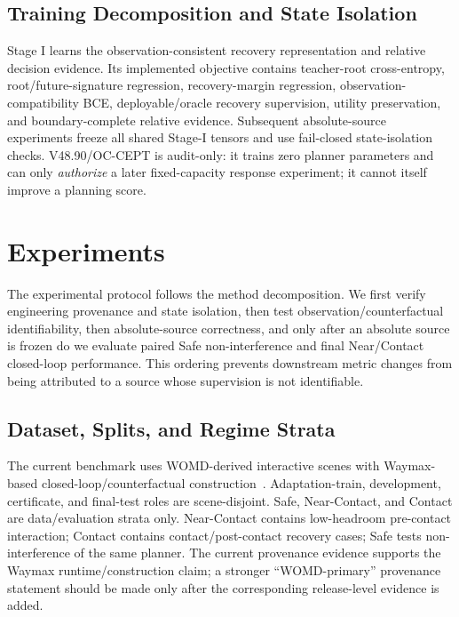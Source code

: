 \documentclass[conference]{IEEEtran}
\begin{document}
\subsection{Training Decomposition and State Isolation}
\label{subsec:training}
Stage I learns the observation-consistent recovery representation and relative decision evidence. Its implemented objective contains teacher-root cross-entropy, root/future-signature regression, recovery-margin regression, observation-compatibility BCE, deployable/oracle recovery supervision, utility preservation, and boundary-complete relative evidence. Subsequent absolute-source experiments freeze all shared Stage-I tensors and use fail-closed state-isolation checks. V48.90/OC-CEPT is audit-only: it trains zero planner parameters and can only \emph{authorize} a later fixed-capacity response experiment; it cannot itself improve a planning score.

\section{Experiments}
\label{sec:experiments}

The experimental protocol follows the method decomposition. We first verify engineering provenance and state isolation, then test observation/counterfactual identifiability, then absolute-source correctness, and only after an absolute source is frozen do we evaluate paired Safe non-interference and final Near/Contact closed-loop performance. This ordering prevents downstream metric changes from being attributed to a source whose supervision is not identifiable.

\subsection{Dataset, Splits, and Regime Strata}
\label{subsec:exp_data}
The current benchmark uses WOMD-derived interactive scenes with Waymax-based closed-loop/counterfactual construction~\cite{ettinger2021large}. Adaptation-train, development, certificate, and final-test roles are scene-disjoint. Safe, Near-Contact, and Contact are data/evaluation strata only. Near-Contact contains low-headroom pre-contact interaction; Contact contains contact/post-contact recovery cases; Safe tests non-interference of the same planner. The current provenance evidence supports the Waymax runtime/construction claim; a stronger ``WOMD-primary'' provenance statement should be made only after the corresponding release-level evidence is added.
\end{document}

